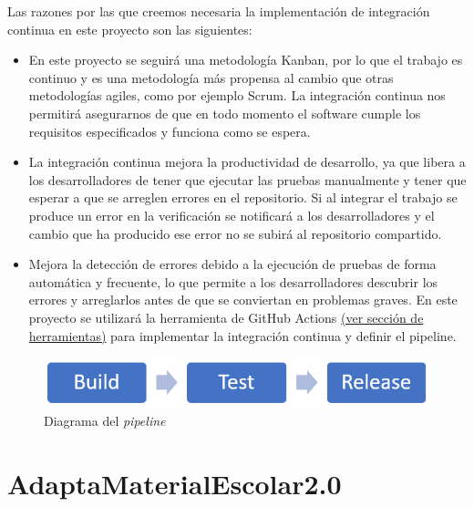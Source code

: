 Las razones por las que creemos necesaria la implementación de integración continua en este proyecto son las siguientes:
\begin{itemize}
    \item En este proyecto se seguirá una metodología Kanban, por lo que el trabajo es continuo y es una metodología más propensa al cambio que otras metodologías agiles, como por ejemplo Scrum. La integración continua nos permitirá asegurarnos de que en todo momento el software cumple los requisitos especificados y funciona como se espera.
    \item La integración continua mejora la productividad de desarrollo, ya que libera a los desarrolladores de tener que ejecutar las pruebas manualmente y tener que esperar a que se arreglen errores en el repositorio. Si al integrar el trabajo se produce un error en la verificación se notificará a los desarrolladores y el cambio que ha producido ese error no se subirá al repositorio compartido.
    \item Mejora la detección de errores debido a la ejecución de pruebas de forma automática y frecuente, lo que permite a los desarrolladores descubrir los errores y arreglarlos antes de que se conviertan en problemas graves.
          En este proyecto se utilizará la herramienta de GitHub Actions \underline{(ver sección de herramientas)} para implementar la integración continua y definir el pipeline.
\end{itemize}
\begin{figure}[ht!]
    \centering
    \includegraphics[scale=0.7]{../Imagenes/DiagramaPipeline.png}
    \caption{Diagrama del \textit{pipeline}}
    \label{d1_pipeline}
\end{figure}

\section{AdaptaMaterialEscolar2.0}
